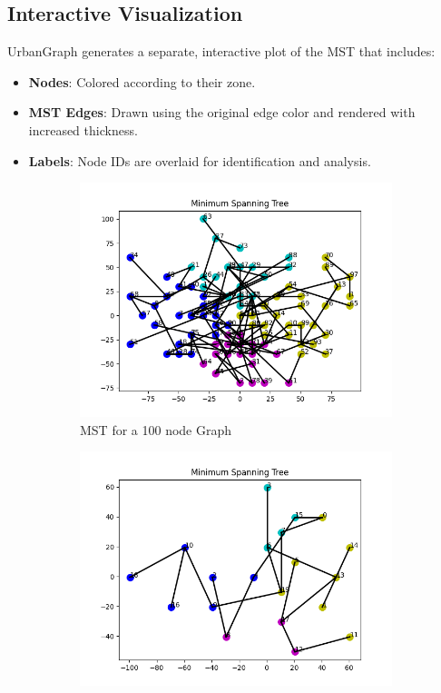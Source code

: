 \documentclass[12pt]{article}
\begin{document}
\subsection*{Interactive Visualization}

UrbanGraph generates a separate, interactive plot of the MST that includes:
\begin{itemize}
    \item \textbf{Nodes}: Colored according to their zone.
    \item \textbf{MST Edges}: Drawn using the original edge color and rendered with increased thickness.
    \item \textbf{Labels}: Node IDs are overlaid for identification and analysis.
\end{itemize}

\begin{figure}[H]
    \centering
    \begin{subfigure}[b]{0.48\textwidth}
        \includegraphics[width=\textwidth]{../Images/sampleMST_1.png}
        \caption{MST for a 100 node Graph}
        \label{fig:mst-1}
    \end{subfigure}
    \hfill
    \begin{subfigure}[b]{0.48\textwidth}
        \includegraphics[width=\textwidth]{../Images/sampleMST_2.png}

\end{subfigure}
\end{figure}
\end{document}
